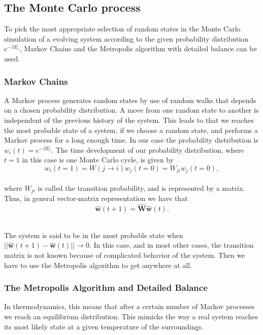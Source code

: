 \documentclass[12pt]{article}
\begin{document}
\begin{flushleft}
\subsection{The Monte Carlo process}
To pick the most appropriate selection of random states in the Monte Carlo simulation of a evolving system according to the given probability distribution $e^{-\beta E_i}$, Markov Chains and the Metropolis algorithm with detailed balance can be used.
\subsubsection{Markov Chains}
A Markov process generates random states by use of random walks that depends on a chosen probability distribution. A move from one random state to another is independent of the previous history of the system. This leads to that we reaches the most probable state of a system, if we choose a random state, and performs a Markov process for a long enough time.
In our case the probability distribution is $w_i(t) = e^{-\beta E_i}$. The time development of our probability distribution, where $t=1$ in this case is one Monte Carlo cycle, is given by
\vspace{5mm}
$$w_i(t=1) = W(j\rightarrow i)w_j(t=0) = W_{ji}w_j(t=0),$$\\
\vspace{5mm} 
where $W_{ji}$ is called the transition probability, and is represented by a matrix. Thus, in general vector-matrix representation we have that
\vspace{5mm}
$$\boldsymbol{\hat{w}}(t+1) = \boldsymbol{\hat{W}}\boldsymbol{\hat{w}}(t).$$\\
\vspace{5mm}

The system is said to be in the most probable state when $||\boldsymbol{\hat{w}}(t+1) -\boldsymbol{\hat{w}}(t)||\rightarrow 0$. In this case, and in most other cases, the transition matrix is not known because of complicated behavior of the system. Then we have to use the Metropolis algorithm to get anywhere at all. 


\subsubsection{The Metropolis Algorithm and Detailed Balance}

In thermodynamics, this means that after a certain number of Markov processes we reach an equilibrium distribution. This mimicks the way a real system reaches its most likely state at a given temperature of the surroundings.


\end{flushleft}
\end{document}

